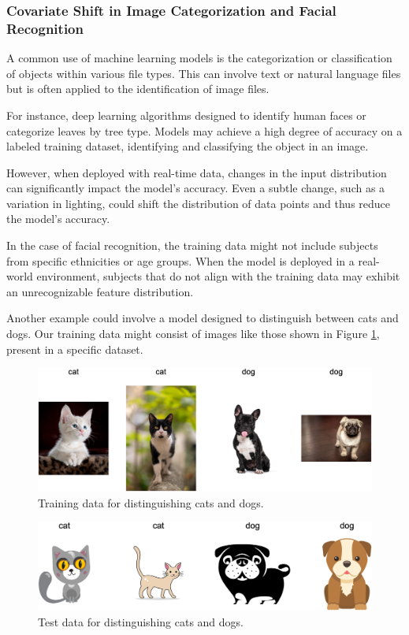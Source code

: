 \subsubsection{Covariate Shift in Image Categorization and Facial Recognition}

A common use of machine learning models is the categorization or classification of objects within various file types. This can involve text or natural language files but is often applied to the identification of image files.

For instance, deep learning algorithms designed to identify human faces or categorize leaves by tree type. Models may achieve a high degree of accuracy on a labeled training dataset, identifying and classifying the object in an image.
 
However, when deployed with real-time data, changes in the input distribution can significantly impact the model's accuracy. Even a subtle change, such as a variation in lighting, could shift the distribution of data points and thus reduce the model's accuracy.

In the case of facial recognition, the training data might not include subjects from specific ethnicities or age groups. When the model is deployed in a real-world environment, subjects that do not align with the training data may exhibit an unrecognizable feature distribution.

Another example could involve a model designed to distinguish between cats and dogs. Our training data might consist of images like those shown in Figure \cref{cani-gatti-tr}, present in a specific dataset.

\vspace{0.5cm}
\begin{figure}[h!]
    \centering
    \includegraphics[width=1\textwidth]{../src/assets/cat-dog-train.png} 
    \caption{Training data for distinguishing cats and dogs.}
    \label{cani-gatti-tr}
\end{figure}

\begin{figure}[h!]
    \centering
    \includegraphics[width=1\textwidth]{../src/assets/cat-dog-test.png} 
    \caption{Test data for distinguishing cats and dogs.}
    \label{cani-gatti-ts}
\end{figure}

